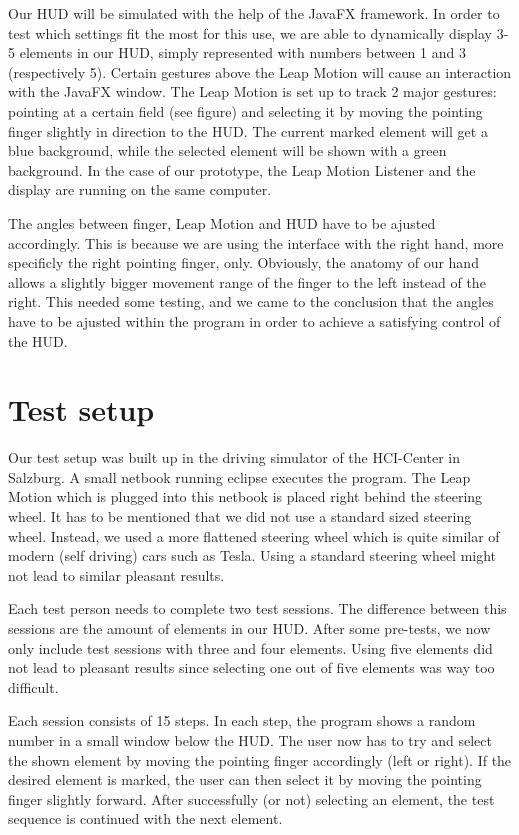 \documentclass{sigchi-ext}
\begin{document}
Our HUD will be simulated with the help of the JavaFX framework. In order to test which settings fit the most for this use,
we are able to dynamically display 3-5 elements in our HUD, simply represented with numbers between 1 and 3 (respectively 5).
Certain gestures above the Leap Motion will cause an interaction with the JavaFX window.
The Leap Motion is set up to track 2 major gestures: pointing at a certain field (see figure)
and selecting it by moving the pointing finger slightly in direction to the HUD. The current marked element will get a blue background, while the selected element will be shown with a green background. In the case of our prototype,
the Leap Motion Listener and the display are running on the same computer.

The angles between finger, Leap Motion and HUD have to be ajusted accordingly. This is because we are using the
interface with the right hand, more specificly the right pointing finger, only. Obviously, the anatomy of our hand
allows a slightly bigger movement range of the finger to the left instead of the right. This needed some testing, and we came to
the conclusion that the angles have to be ajusted within the program in order to achieve a satisfying control of the HUD.

\section{Test setup}
Our test setup was built up in the driving simulator of the HCI-Center in Salzburg. A small netbook running eclipse executes the program. The Leap Motion which is plugged into this netbook is placed right behind the steering wheel. It has to be mentioned that we did not use a standard sized steering wheel. Instead, we used a more flattened steering wheel which is quite similar of modern (self driving) cars such as Tesla. Using a standard steering wheel might not lead to similar pleasant results.

Each test person needs to complete two test sessions. The difference between this sessions are the amount of elements in our HUD. After some pre-tests, we now only include test sessions with three and four elements. Using five elements did not lead to pleasant results since selecting one out of five elements was way too difficult.

Each session consists of 15 steps. In each step, the program shows a random number in a small window below the HUD. The user  now has to try and select the shown element by moving the pointing finger accordingly (left or right). If the desired element is marked, the user can then select it by moving the pointing finger slightly forward. After successfully (or not) selecting an element, the test sequence is continued with the next element.
\end{document}
